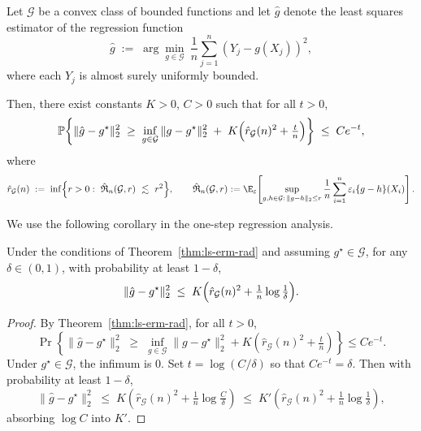 \begin{theorem}
\label{thm:ls-erm-rad}
Let \(\mathcal G\) be a convex class of bounded functions and let \(\hat g\)
denote the least squares estimator of the regression function
\[
\hat g \;:=\; \arg\min_{g\in\mathcal G}\ \frac{1}{n}\sum_{j=1}^n (Y_j - g(X_j))^2,
\]
where each \(Y_j\) is almost surely uniformly bounded.

Then, there exist constants \(K>0\), \(C>0\) such that for all \(t>0\),
\[
\mathbb P\!\left\{
\|\hat g - g^\star\|_{2}^2
\;\ge\;
\inf_{g\in\mathcal G}\|g - g^\star\|_{2}^2
\;+\; K\Bigl(\hat r_{\mathcal G}(n)^2 + \tfrac{t}{n}\Bigr)
\right\}
\;\le\; C e^{-t},
\]
where
\[
\hat r_{\mathcal G}(n)
\;:=\;\inf\Bigl\{r>0:\ \hat{\mathfrak{R}}_n(\mathcal G,r)\ \lesssim\ r^2\Bigr\},
\qquad
\hat{\mathfrak{R}}_n(\mathcal G,r)
:= \E_{\varepsilon}\!\left[
\sup_{\substack{g,h\in\mathcal G:\,\|g-h\|_2 \le r}}
\frac{1}{n}\sum_{i=1}^n \varepsilon_i\{g-h\}(X_i)
\right].
\]
\end{theorem}

We use the following corollary in the one-step regression analysis.

\begin{corollary}
\label{cor::excessLS}
Under the conditions of Theorem~\ref{thm:ls-erm-rad} and assuming
\(g^\star \in \mathcal G\), for any \(\delta\in(0,1)\), with probability at
least \(1-\delta\),
\[
\|\hat g - g^\star\|_{2}^2
\;\le\;
K\Bigl(\hat r_{\mathcal G}(n)^2 + \tfrac{1}{n}\log\tfrac{1}{\delta}\Bigr).
\]
\end{corollary}

\begin{proof}
By Theorem~\ref{thm:ls-erm-rad}, for all \(t>0\),
\[
\Pr\!\left\{
\|\hat g-g^\star\|_{2}^2
\;\ge\; \inf_{g\in\mathcal{G}}\|g-g^\star\|_{2}^2
+ K\!\left(\hat r_{\mathcal{G}}(n)^2+\tfrac{t}{n}\right)
\right\}\le C e^{-t}.
\]
Under \(g^\star\in\mathcal{G}\), the infimum is \(0\). Set
\(t=\log(C/\delta)\) so that \(Ce^{-t}=\delta\). Then with probability at
least \(1-\delta\),
\[
\|\hat g-g^\star\|_{2}^2
\;\le\; K\!\left(\hat r_{\mathcal{G}}(n)^2+\tfrac{1}{n}\log\tfrac{C}{\delta}\right)
\;\le\; K'\!\left(\hat r_{\mathcal{G}}(n)^2+\tfrac{1}{n}\log\tfrac{1}{\delta}\right),
\]
absorbing \(\log C\) into \(K'\).
\end{proof}
